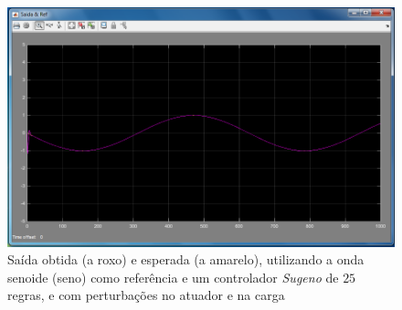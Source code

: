 \documentclass{article}
\begin{document}
\begin{figure}[h]
  \centering
      \includegraphics[scale=0.3]{Images/Sugeno_25_sin_actuator_charge.png}
  \caption{Saída obtida (a roxo) e esperada (a amarelo), utilizando a onda senoide (seno) como referência e um controlador \emph{Sugeno} de $25$ regras, e com perturbações no atuador e na carga}
\end{figure}
\end{document}
